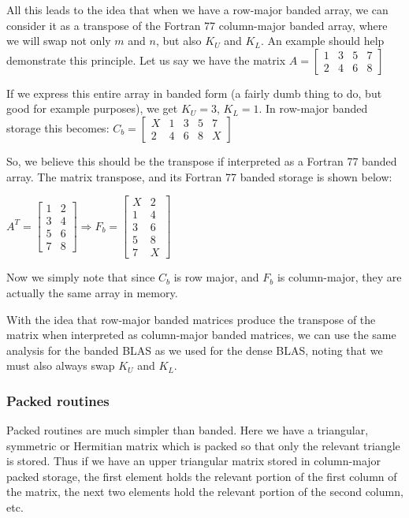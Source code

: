 \documentclass{article}
\begin{document}
All this leads to the idea that when we have a row-major banded array, we can
consider it as a transpose of the Fortran 77 column-major banded array, where
we will swap not only $m$ and $n$, but also $K_U$ and $K_L$.  An example should
help demonstrate this principle.  Let us say we have the matrix 
$
A = \left [
\begin{array}{rrrr}
1 & 3 & 5 & 7\\
2 & 4 & 6 & 8
\end{array}
\right ]  
$

If we express this entire array in banded form (a fairly dumb thing to do,
but good for example purposes), we get
$K_U = 3$, $K_L = 1$.  In row-major banded storage this becomes:
$
C_b = \left [
\begin{array}{rrrrr}
X & 1 & 3 & 5 & 7\\
2 & 4 & 6 & 8 & X
\end{array}
\right ]  $

So, we believe this should be the transpose if interpreted as a Fortran 77
banded array.  The matrix transpose, and its Fortran 77 banded storage is shown
below:

$A^T = \left [
\begin{array}{rr}
1 & 2\\
3 & 4\\
5 & 6\\
7 & 8
\end{array}
\right ]  \Rightarrow
F_b = \left [
\begin{array}{rr}
X & 2\\
1 & 4\\
3 & 6\\
5 & 8\\
7 & X
\end{array}
\right ]$

Now we simply note that since $C_b$ is row major, and $F_b$ is column-major,
they are actually the same array in memory.

With the idea that row-major banded matrices produce the transpose of the matrix
when interpreted as column-major banded matrices, we can use the same analysis
for the banded BLAS as we used for the dense BLAS, noting that we must also
always swap $K_U$ and $K_L$.

\subsubsection{Packed routines}
Packed routines are much simpler than banded.  Here we have a triangular,
symmetric or Hermitian matrix which is packed so that only the relevant triangle
is stored.  Thus if we have an upper triangular matrix stored in column-major
packed storage, the first element holds the relevant portion of the first column
of the matrix, the next two elements hold the relevant portion of the second
column, etc.
\end{document}
